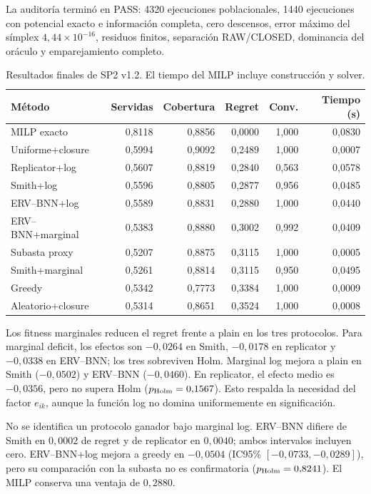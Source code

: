 La auditoría terminó en PASS: 4320 ejecuciones poblacionales, 1440 ejecuciones con
potencial exacto e información completa, cero descensos, error máximo del símplex
$4{,}44\times10^{-16}$, residuos finitos, separación RAW/CLOSED, dominancia del
oráculo y emparejamiento completo.

\begin{table}[H]
\centering
\scriptsize
\begin{tabularx}{\textwidth}{@{}p{}rrrrr@{}}
\toprule
Método & Servidas & Cobertura & Regret & Conv. & Tiempo (s) \\
\midrule
MILP exacto & 0,8118 & 0,8856 & 0,0000 & 1,000 & 0,0830 \\
Uniforme+closure & 0,5994 & 0,9092 & 0,2489 & 1,000 & 0,0007 \\
Replicator+log & 0,5607 & 0,8819 & 0,2840 & 0,563 & 0,0578 \\
Smith+log & 0,5596 & 0,8805 & 0,2877 & 0,956 & 0,0485 \\
ERV--BNN+log & 0,5589 & 0,8831 & 0,2880 & 1,000 & 0,0440 \\
ERV--BNN+marginal & 0,5383 & 0,8880 & 0,3002 & 0,992 & 0,0409 \\
Subasta proxy & 0,5207 & 0,8875 & 0,3115 & 1,000 & 0,0005 \\
Smith+marginal & 0,5261 & 0,8814 & 0,3115 & 0,950 & 0,0495 \\
Greedy & 0,5342 & 0,7773 & 0,3384 & 1,000 & 0,0009 \\
Aleatorio+closure & 0,5314 & 0,8651 & 0,3524 & 1,000 & 0,0008 \\
\bottomrule
\end{tabularx}
\caption{Resultados finales de SP2 v1.2. El tiempo del MILP incluye construcción y solver.}
\label{tab:sp2-heterogeneous-summary}
\end{table}

Los fitness marginales reducen el regret frente a plain en los tres protocolos. Para
marginal deficit, los efectos son $-0{,}0264$ en Smith, $-0{,}0178$ en replicator y
$-0{,}0338$ en ERV--BNN; los tres sobreviven Holm. Marginal log mejora a plain en
Smith ($-0{,}0502$) y ERV--BNN ($-0{,}0460$). En replicator, el efecto medio es
$-0{,}0356$, pero no supera Holm ($p_{\rm Holm}=0{,}1567$). Esto respalda la necesidad
del factor $e_{ik}$, aunque la función log no domina uniformemente en significación.

No se identifica un protocolo ganador bajo marginal log. ERV--BNN difiere de Smith en
$0{,}0002$ de regret y de replicator en $0{,}0040$; ambos intervalos incluyen cero.
ERV--BNN+log mejora a greedy en $-0{,}0504$ (IC95\%
$[-0{,}0733,-0{,}0289]$), pero su comparación con la subasta no es confirmatoria
($p_{\rm Holm}=0{,}8241$). El MILP conserva una ventaja de $0{,}2880$.

